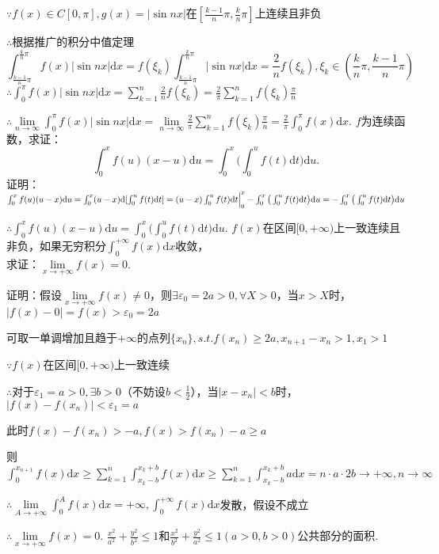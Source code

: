 \documentclass[12pt,UTF8]{ctexart}
\begin{document}
\begin{enumerate}
$\because f(x)\in C[0,\pi],g(x)=|\sin nx|$在$[\frac{k-1}n\pi,\frac kn\pi]$上连续且非负

$\therefore$根据推广的积分中值定理
\[\int_{\frac{k-1}n\pi}^{\frac kn\pi}f(x)|\sin nx|\mathrm dx=f(\xi_k)\int_{\frac{k-1}n\pi}^{\frac kn\pi}|\sin nx|\mathrm dx=\frac2nf(\xi_k),\xi_k\in(\frac kn\pi,\frac{k-1}n\pi)\]
$\therefore\int_0^\pi f(x)|\sin nx|\mathrm dx=\sum_{k=1}^n\frac2nf(\xi_k)=\frac2\pi\sum_{k=1}^nf(\xi_k)\frac\pi n$

$\therefore\lim\limits_{n\rightarrow\infty}\int_0^{\pi}f(x)|\sin nx|\mathrm dx=\lim\limits_{n\rightarrow\infty}\frac2\pi\sum_{k=1}^nf(\xi_k)\frac\pi n=\frac2\pi\int_0^\pi f(x)\mathrm dx$.
$f$为连续函数，求证：
\[
\int_0^xf(u)(x-u)\mathrm du=\int_0^x\big(\int_0^uf(t)\mathrm dt\big)\mathrm du.
\]
证明：$\int_0^xf(u)(u-x)\mathrm du=\int_0^x(u-x)\mathrm d[\int_0^uf(t)\mathrm dt]=(u-x)\int_0^uf(t)\mathrm dt\Big|_0^x-\int_0^x\big(\int_0^uf(t)\mathrm dt\big)\mathrm du\\
=-\int_0^x\big(\int_0^uf(t)\mathrm dt\big)\mathrm du$

$\therefore\int_0^xf(u)(x-u)\mathrm du=\int_0^x\big(\int_0^uf(t)\mathrm dt\big)\mathrm du$.
$f(x)$在区间$[0,+\infty)$上一致连续且非负，如果无穷积分$\int_0^{+\infty}f(x)\mathrm dx$收敛，\\求证：$\lim\limits_{x\rightarrow+\infty}f(x)=0$.

证明：假设$\lim\limits_{x\rightarrow+\infty}f(x)\neq0$，则$\exists\varepsilon_0=2a>0,\forall X>0$，当$x>X$时，\\$|f(x)-0|=f(x)>\varepsilon_0=2a$

可取一单调增加且趋于$+\infty$的点列$\{x_n\},s.t.f(x_n)\geq2a,x_{n+1}-x_n>1,x_1>1$

$\because f(x)$在区间$[0,+\infty)$上一致连续

$\therefore$对于$\varepsilon_1=a>0,\exists b>0$（不妨设$b<\frac12$），当$|x-x_n|<b$时，$|f(x)-f(x_n)|<\varepsilon_1=a$

此时$f(x)-f(x_n)>-a,f(x)>f(x_n)-a\geq a$

则$\int_0^{x_{n+1}}f(x)\mathrm dx\geq\sum_{k=1}^n\int_{x_k-b}^{x_k+b}f(x)\mathrm dx\geq\sum_{k=1}^n\int_{x_k-b}^{x_k+b}a\mathrm dx=n\cdot a\cdot2b\rightarrow+\infty,n\rightarrow\infty$

$\therefore\lim\limits_{A\rightarrow+\infty}\int_0^Af(x)\mathrm dx=+\infty,\int_0^{+\infty}f(x)\mathrm dx$发散，假设不成立

$\therefore\lim\limits_{x\rightarrow+\infty}f(x)=0$.
$\frac{x^2}{a^2}+\frac{y^2}{b^2}\leq1$和$\frac{x^2}{b^2}+\frac{y^2}{a^2}\leq1(a>0,b>0)$公共部分的面积.


\end{enumerate}
\end{document}

